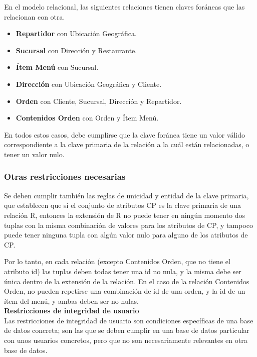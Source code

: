 En el modelo relacional, las siguientes relaciones tienen claves foráneas que las relacionan con otra.

\begin{itemize}
    \item \textbf{Repartidor} con Ubicación Geográfica.
    \item \textbf{Sucursal} con Dirección y Restaurante.
    \item \textbf{Ítem Menú} con Sucursal.
    \item \textbf{Dirección} con Ubicación Geográfica y Cliente.
    \item \textbf{Orden} con Cliente, Sucursal, Dirección y Repartidor.
    \item \textbf{Contenidos Orden} con Orden y Ítem Menú.
\end{itemize}

En todos estos casos, debe cumplirse que la clave foránea tiene un valor válido correspondiente a la clave primaria de la relación a la cuál están relacionadas, o tener un valor nulo.

\subsubsection{Otras restricciones necesarias}

Se deben cumplir también las reglas de unicidad y entidad de la clave primaria, que establecen que si el conjunto de atributos CP es la clave primaria de una relación R, entonces la extensión de R no puede tener en ningún momento dos tuplas con la misma combinación de valores para los atributos de CP, y tampoco puede tener ninguna tupla con algún valor nulo para alguno de los atributos de CP.

Por lo tanto, en cada relación (excepto Contenidos Orden, que no tiene el atributo id) las tuplas deben todas tener una id no nula, y la misma debe ser única dentro de la extensión de la relación. En el caso de la relación Contenidos Orden, no pueden repetirse una combinación de id de una orden, y la id de un ítem del menú, y ambas deben ser no nulas. \\

\textbf{Restricciones de integridad de usuario} \\

Las restricciones de integridad de usuario son condiciones específicas de una base de datos concreta; son las que se deben cumplir en una base de datos particular con unos usuarios concretos, pero que no son necesariamente relevantes en otra base de datos.

